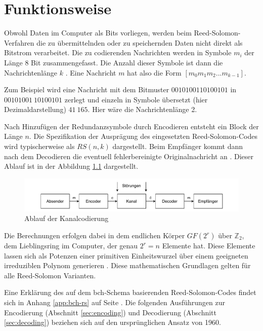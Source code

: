 \chapter{Funktionsweise}\label{ch:operatingPrinciple}

Obwohl Daten im Computer als Bits vorliegen, werden beim Reed-Solomon-Verfahren die zu übermittelnden oder zu speichernden Daten nicht direkt als Bitstrom verarbeitet.
Die zu codierenden Nachrichten werden in Symbole $m_{i}$ der Länge 8 Bit zusammengefasst.
Die Anzahl dieser Symbole ist dann die Nachrichtenlänge $k$ \cite{rileyReedSolomonCodes}.
Eine Nachricht $m$ hat also die Form $[m_{0}m_{1}m_{2}...m_{k-1}]$.

Zum Beispiel wird eine Nachricht mit dem Bitmuster $0010100110100101$ in $00101001\ 10100101$ zerlegt und einzeln in Symbole übersetzt (hier Dezimaldarstellung) $41\ 165$. Hier wäre die Nachrichtenlänge 2.

Nach Hinzufügen der Redundanzsymbole durch Encodieren entsteht ein Block der Länge $n$.
Die Spezifikation der Ausprägung des eingesetzten Reed-Solomon-Codes wird typischerweise als $RS(n, k)$ dargestellt.
Beim Empfänger kommt dann nach dem Decodieren die eventuell fehlerbereinigte Originalnachricht an \cite{hubertPracticalReedSolomonProgrammers2021}.
Dieser Ablauf ist in der Abbildung \ref{fig:channelcoding} dargestellt.
\begin{figure}[h]
	\centering
	\includegraphics[width=1\textwidth]{figures/Kanalcodierung.drawio.pdf}
	\caption{Ablauf der Kanalcodierung}
	\label{fig:channelcoding}
\end{figure}

Die Berechnungen erfolgen dabei in dem endlichen Körper $GF(2^r)$ über $\mathbb{Z}_2$, dem Lieblingsring im Computer, der genau $2^r=n$ Elemente hat.
Diese Elemente lassen sich als Potenzen einer primitiven Einheitswurzel über einem geeigneten irreduziblen Polynom generieren \cite[Kapitel 3]{weitzKonkreteMathematikNicht2021}.
Diese mathematischen Grundlagen gelten für alle Reed-Solomon Varianten.
 
Eine Erklärung des auf dem \acrshort{bch}-Schema basierenden Reed-Solomon-Codes findet sich in Anhang \ref{app:bch-rs} auf Seite \pageref{app:bch-rs}.
Die folgenden Ausführungen zur Encodierung (Abschnitt \ref{sec:encoding}) und Decodierung (Abschnitt \ref{sec:decoding}) beziehen sich auf den ursprünglichen Ansatz von 1960.

